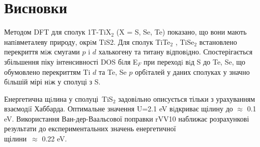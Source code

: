 \chapter*{Висновки}
Методом DFT для сполук 1T-TiX$_2$ (X = S, Se, Te) показано, що вони мають напiвметалеву природу, окрiм TiS2. Для сполук TiTe$_2$ , TiSe$_2$ встановлено перекриття мiж смугами $p$ i $d$ халькогену та титану вiдповiдно. Спостерігається збільшення піку інтенсивності DOS бiля E$_F$ при переходi вiд S до Te, Se, що обумовлено перекриттям Ti $d$ та Te, Se $p$ орбiталей у даних сполуках у значно бiльшій мірі нiж у сполуці з S.

Енергетична щiлина у сполуці TiS$_2$ задовільно описується тільки з урахуванням взаємодiї Хаббарда. Оптимальне значення U=2.1 eV вiдкриває щілину до $\approx$ 0.1 eV. Використання Ван-дер-Ваальсової поправки rVV10 наближає розрахункові результати до експериментальних значень енергетичної \\
 щілини $\approx$ 0.22 eV.